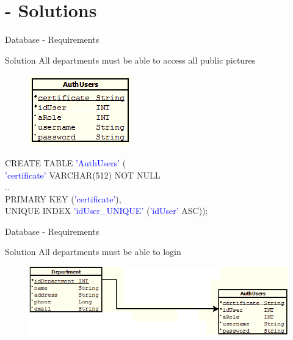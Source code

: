 \section{ - Solutions}
\begin{frame}{Database - Requirements}
    \begin{block}{Solution}
					All departments must be able to access all public pictures
					
\begin{figure}[h]
	\centering
		\includegraphics{Img/DatabaseQR.png}
\end{figure}

\small \textcolor{dgreen}{CREATE  TABLE} \textcolor{blue}{'AuthUsers'} ( \\
\small \textcolor{blue}{'certificate'} \textcolor{dgreen}{VARCHAR(512) NOT NULL} \\
\small .. \\
\small \textcolor{dgreen}{PRIMARY KEY} (\textcolor{blue}{'certificate'}), \\
\small \textcolor{dgreen}{UNIQUE INDEX} \textcolor{blue}{'idUser\_UNIQUE'} (\textcolor{blue}{'idUser'} \textcolor{dgreen}{ASC}));

    \end{block}
\end{frame}

\begin{frame}{Database - Requirements}
    \begin{block}{Solution}
					All departments must be able to login

\begin{figure}[h]
	\centering
		\includegraphics[width=1.00\textwidth]{Img/DatabaseDept.png}
	\label{fig:DatabaseDept}
\end{figure}
   \end{block}
\end{frame}
